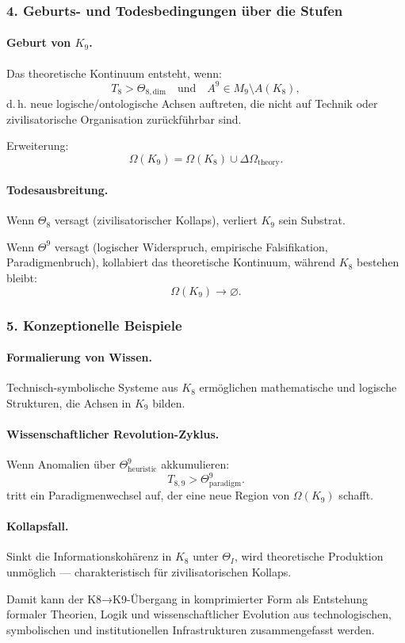 \subsubsection{4. Geburts- und Todesbedingungen über die Stufen}

\paragraph{Geburt von \texorpdfstring{$K_9$}{K_9}.}
Das theoretische Kontinuum entsteht, wenn:
\[
T_8 > \Theta_{8,\mathrm{dim}}
\quad\text{und}\quad
A^9 \in M_9 \setminus A(K_8),
\]
d.\,h. neue logische/ontologische Achsen auftreten, die nicht auf Technik oder
zivilisatorische Organisation zurückführbar sind.

Erweiterung:
\[
\Omega(K_9) = \Omega(K_8) \cup \Delta\Omega_{\mathrm{theory}}.
\]

\paragraph{Todesausbreitung.}
Wenn $\Theta_8$ versagt (zivilisatorischer Kollaps), verliert $K_9$ sein
Substrat.

Wenn $\Theta^9$ versagt (logischer Widerspruch, empirische Falsifikation,
Paradigmenbruch), kollabiert das theoretische Kontinuum, während $K_8$ bestehen bleibt:
\[
\Omega(K_9) \rightarrow \varnothing.
\]

\subsubsection{5. Konzeptionelle Beispiele}

\paragraph{Formalierung von Wissen.}
Technisch-symbolische Systeme aus $K_8$ ermöglichen mathematische und logische
Strukturen, die Achsen in $K_9$ bilden.

\paragraph{Wissenschaftlicher Revolution-Zyklus.}
Wenn Anomalien über $\Theta^9_{\mathrm{heuristic}}$ akkumulieren:
\[
T_{8,9} > \Theta^9_{\mathrm{paradigm}}.
\]
tritt ein Paradigmenwechsel auf, der eine neue Region von $\Omega(K_9)$ schafft.

\paragraph{Kollapsfall.}
Sinkt die Informationskohärenz in $K_8$ unter $\Theta_I$, wird
theoretische Produktion unmöglich — charakteristisch für zivilisatorischen
Kollaps.

Damit kann der K8→K9-Übergang in komprimierter Form als Entstehung formaler
Theorien, Logik und wissenschaftlicher Evolution aus technologischen, symbolischen
und institutionellen Infrastrukturen zusammengefasst werden.
